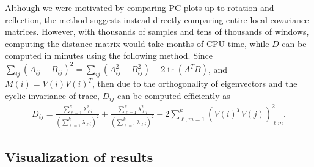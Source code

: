 \documentclass[11pt, oneside]{article}   	%
\DeclareMathOperator{\tr}{tr}
\begin{document}
Although we were motivated by comparing PC plots up to rotation and reflection,
the method suggests instead directly comparing entire local covariance matrices. 
However, with thousands of samples and tens of thousands of windows,
computing the distance matrix would take months of CPU time,
while $D$ can be computed in minutes using the following method.
Since 
$\sum_{ij} (A_{ij}-B_{ij})^2 = \sum_{ij} (A^2_{ij} + B^2_{ij}) - 2 \tr(A^T B)$,
and $M(i) = V(i) V(i)^T$,
then due to the orthogonality of eigenvectors and the cyclic invariance of trace,
$D_{ij}$ can be computed efficiently as
\begin{align}
    D_{ij} 
    = 
    \frac{ \sum_{\ell=1}^k \lambda_{\ell i}^2 }{ (\sum_{\ell=1}^k \lambda_{\ell i})^2 }
    + \frac{ \sum_{\ell=1}^k \lambda_{\ell j}^2 }{ (\sum_{\ell=1}^k \lambda_{\ell j})^2 }
    - 2 \sum_{\ell, m=1}^k (V(i)^T V(j))^2_{\ell m} .
\end{align}


\subsection{Visualization of results}
\end{document}
